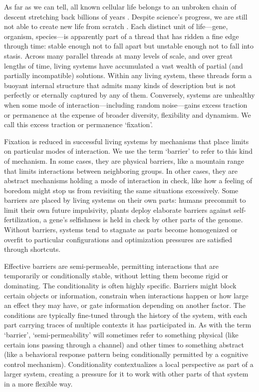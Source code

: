 \documentclass[11pt]{article}
\begin{document}
As far as we can tell, all known cellular life belongs to an unbroken chain of descent stretching back billions of years \citep{theobald2010formal}. Despite science's progress, we are still not able to create new life from scratch \citep{kriebisch2025roadmap}. Each distinct unit of life---gene, organism, species---is apparently part of a thread that has ridden a fine edge through time: stable enough not to fall apart but unstable enough not to fall into stasis. Across many parallel threads at many levels of scale, and over great lengths of time, living systems have accumulated a vast wealth of partial (and partially incompatible) solutions. Within any living system, these threads form a buoyant internal structure that admits many kinds of description but is not perfectly or eternally captured by any of them. Conversely, systems are unhealthy when some mode of interaction---including random noise---gains excess traction or permanence at the expense of broader diversity, flexibility and dynamism. We call this excess traction or permanence `fixation'.
 
Fixation is reduced in successful living systems by mechanisms that place limits on particular modes of interaction. We use the term `barrier' to refer to this kind of mechanism. In some cases, they are physical barriers, like a mountain range that limits interactions between neighboring groups. In other cases, they are abstract mechanisms holding a mode of interaction in check, like how a feeling of boredom might stop us from revisiting the same situations excessively. Some barriers are placed by living systems on their own parts: humans precommit to limit their own future impulsivity, plants deploy elaborate barriers against self-fertilization, a gene's selfishness is held in check by other parts of the genome. Without barriers, systems tend to stagnate as parts become homogenized or overfit to particular configurations and optimization pressures are satisfied through shortcuts.

Effective barriers are semi-permeable, permitting interactions that are temporarily or conditionally stable, without letting them become rigid or dominating. The conditionality is often highly specific. Barriers might block certain objects or information, constrain when interactions happen or how large an effect they may have, or gate information depending on another factor. The conditions are typically fine-tuned through the history of the system, with each part carrying traces of multiple contexts it has participated in. As with the term `barrier', `semi-permeability' will sometimes refer to something physical (like certain ions passing through a channel) and other times to something abstract (like a behavioral response pattern being conditionally permitted by a cognitive control mechanism). Conditionality contextualizes a local perspective as part of a larger system, creating a pressure for it to work with other parts of that system in a more flexible way. 
\end{document}
